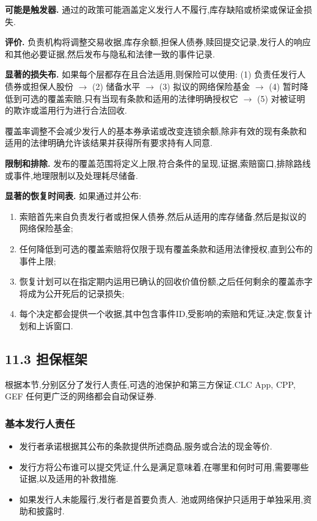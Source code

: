 \documentclass[11pt]{article}
\begin{document}
\textbf{可能是触发器.} 通过的政策可能涵盖定义发行人不履行,库存缺陷或桥梁或保证金损失.

\textbf{评价.} 负责机构将调整交易收据,库存余额,担保人债券,赎回提交记录,发行人的响应和其他必要证据,然后发布与隐私和法律一致的事件记录.

\textbf{显著的损失布.} 如果每个层都存在且合法适用,则保险可以使用: (1) 负责任发行人债券或担保人股份 $\to$ (2) 储备水平 $\to$ (3) 拟议的网络保险基金 $\to$ (4) 暂时降低到可选的覆盖索赔,只有当现有条款和适用的法律明确授权它 $\to$ (5) 对被证明的欺诈或滥用行为进行合法回收.

覆盖率调整不会减少发行人的基本券承诺或改变连锁余额,除非有效的现有条款和适用的法律明确允许该结果并获得所有要求持有人同意.

\textbf{限制和排除.} 发布的覆盖范围将定义上限,符合条件的呈现,证据,索赔窗口,排除路线或事件,地理限制以及处理耗尽储备.

\textbf{显著的恢复时间表.} 如果通过并公布:

\begin{enumerate}[leftmargin=*]
\item 索赔首先来自负责发行者或担保人债券,然后从适用的库存储备,然后是拟议的网络保险基金;
\item 任何降低到可选的覆盖索赔将仅限于现有覆盖条款和适用法律授权,直到公布的事件上限;
\item 恢复计划可以在指定期内运用已确认的回收价值份额,之后任何剩余的覆盖赤字将成为公开死后的记录损失;
\item 每个决定都会提供一个收据,其中包含事件ID,受影响的索赔和凭证,决定,恢复计划和上诉窗口.
\end{enumerate}
\subsection*{11.3 担保框架}

根据本节,分别区分了发行人责任,可选的池保护和第三方保证.CLC App, CPP, GEF 任何更广泛的网络都会自动保证券.

\subsubsection*{基本发行人责任}

\begin{itemize}[leftmargin=*]
\item 发行者承诺根据其公布的条款提供所述商品,服务或合法的现金等价.
\item 发行方将公布谁可以提交凭证,什么是满足意味着,在哪里和何时可用,需要哪些证据,以及适用的补救措施.
\item 如果发行人未能履行,发行者是首要负责人. 池或网络保护只适用于单独采用,资助和披露时.
\end{itemize}
\end{document}
